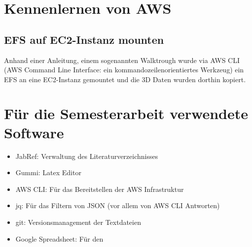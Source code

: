 \section{Kennenlernen von AWS}

\subsection{EFS auf EC2-Instanz mounten}
Anhand einer Anleitung, einem sogenannten Walktrough wurde via AWS CLI (AWS Command Line Interface: ein kommandozeilenorientiertes Werkzeug) ein
EFS an eine EC2-Instanz gemountet und die 3D Daten wurden dorthin kopiert.

\section{Für die Semesterarbeit verwendete Software}
\begin{itemize}
\item JabRef: Verwaltung des Literaturverzeichnisses
\item Gummi: Latex Editor
\item AWS CLI: Für das Bereitstellen der AWS Infrastruktur
\item jq: Für das Filtern von JSON (vor allem von AWS CLI Antworten)
\item git: Versionsmanagement der Textdateien
\item Google Spreadsheet: Für den 
\end{itemize}